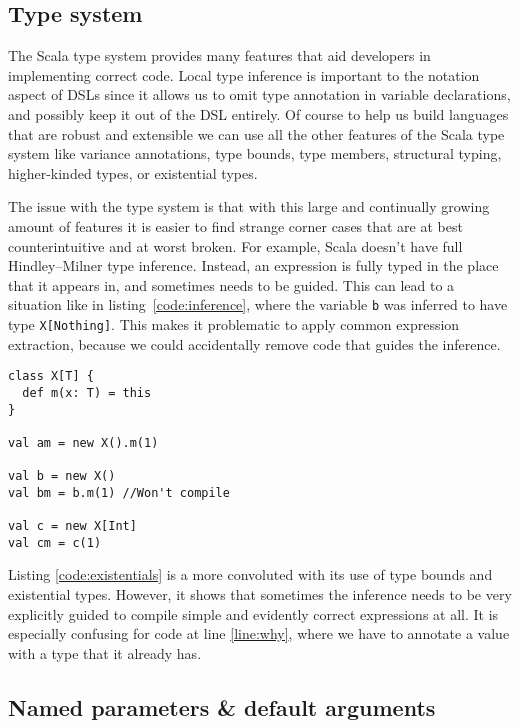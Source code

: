 \subsection{Type system}

The Scala type system provides many features that aid developers in implementing correct code. Local type inference is important to the notation aspect of DSLs since it allows us to omit type annotation in variable declarations, and possibly keep it out of the DSL entirely. Of course to help us build languages that are robust and extensible we can use all the other features of the Scala type system like variance annotations, type bounds, type members, structural typing, higher-kinded types, or existential types.

The issue with the type system is that with this large and continually growing amount of features it is easier to find strange corner cases that are at best counterintuitive and at worst broken. For example, Scala doesn't have full Hindley–Milner type inference. Instead, an expression is fully typed in the place that it appears in, and sometimes needs to be guided. This can lead to a situation like in listing~\ref{code:inference}, where the variable \texttt{b} was inferred to have type \texttt{X[Nothing]}. This makes it problematic to apply common expression extraction, because we could accidentally remove code that guides the inference.

\begin{lstlisting}[caption=Local inference, label=code:inference, float]
class X[T] {
  def m(x: T) = this
}

val am = new X().m(1)

val b = new X()
val bm = b.m(1) //Won't compile

val c = new X[Int]
val cm = c(1)
\end{lstlisting}

Listing \ref{code:existentials} is a more convoluted with its use of type bounds and existential types. However, it shows that sometimes the inference needs to be very explicitly guided to compile simple and evidently correct expressions at all. It is especially confusing for code at line \ref{line:why}, where we have to annotate a value with a type that it already has.

\subsection{Named parameters \& default arguments}

